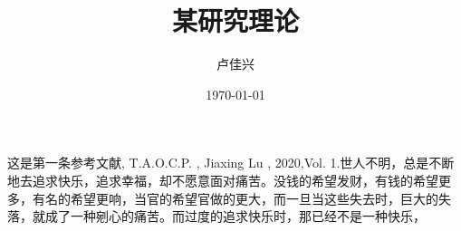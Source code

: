 \documentclass[a4paper,12pt]{report}
\begin{document}
    
\title{某研究理论}  %
\author{卢佳兴}  %
\date{\today}    %
\maketitle 



    \begin{thebibliography}{123456}
        \bibitem 这是第一条参考文献, T.A.O.C.P. , Jiaxing Lu , 2020,Vol. 1.世人不明，总是不断地去追求快乐，追求幸福，却不愿意面对痛苦。没钱的希望发财，有钱的希望更多，有名的希望更响，当官的希望官做的更大，而一旦当这些失去时，巨大的失落，就成了一种剜心的痛苦。而过度的追求快乐时，那已经不是一种快乐，
   
    \end{thebibliography}
\tableofcontents



\end{document}
